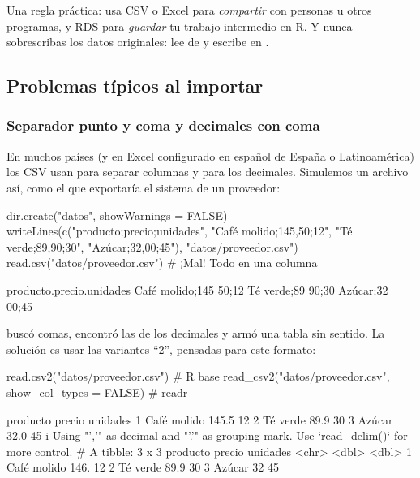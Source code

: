 \begin{consejo}
Una regla práctica: usa CSV o Excel para \emph{compartir} con personas u
otros programas, y RDS para \emph{guardar} tu trabajo intermedio en R. Y
nunca sobrescribas los datos originales: lee de  y
escribe en .
\end{consejo}

\subsection{Problemas típicos al importar}

\subsubsection{Separador punto y coma y decimales con coma}

En muchos países (y en Excel configurado en español de España o
Latinoamérica) los CSV usan \codigo{;} para separar columnas y \codigo{,}
para los decimales. Simulemos un archivo así, como el que exportaría el
sistema de un proveedor:

\begin{rcode}
dir.create("datos", showWarnings = FALSE)
writeLines(c("producto;precio;unidades",
             "Café molido;145,50;12",
             "Té verde;89,90;30",
             "Azúcar;32,00;45"),
           "datos/proveedor.csv")
read.csv("datos/proveedor.csv")          # ¡Mal! Todo en una columna
\end{rcode}
\begin{rsalida}
                producto.precio.unidades
Café molido;145                    50;12
Té verde;89                        90;30
Azúcar;32                          00;45
\end{rsalida}

 buscó comas, encontró las de los decimales y armó una
tabla sin sentido. La solución es usar las variantes ``2'', pensadas para
este formato:

\begin{rcode}
read.csv2("datos/proveedor.csv")                           # R base
read_csv2("datos/proveedor.csv", show_col_types = FALSE)   # readr
\end{rcode}
\begin{rsalida}
     producto precio unidades
1 Café molido  145.5       12
2    Té verde   89.9       30
3      Azúcar   32.0       45
i Using "','" as decimal and "'.'" as grouping mark. Use `read_delim()` for more control.
# A tibble: 3 x 3
  producto    precio unidades
  <chr>        <dbl>    <dbl>
1 Café molido  146.        12
2 Té verde      89.9       30
3 Azúcar        32         45
\end{rsalida}

